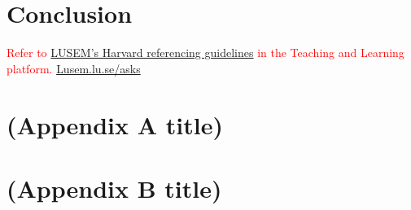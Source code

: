 \documentclass[12pt,twoside]{report}
\newcommand{\mcite}[1]{\textcolor{mycolor}{\citeauthor{#1} (\citeyear{#1})}}
\newcommand{\hcite}[1]{(\textcolor{mycolor}{\citeauthor{#1}, \citeyear{#1}})}
\begin{document}
    \chapter{Conclusion}
    
    
    
    
    \vspace{2.0cm}
    \textcolor{red}{Refer to \href{http://libguides.lub.lu.se/plagiarism}{LUSEM’s Harvard referencing guidelines} in the Teaching and Learning platform. \url{Lusem.lu.se/asks}}

    \appendix
    \chapter{(Appendix A title)}
    
    
     \chapter{(Appendix B title)}
    
\end{document}
